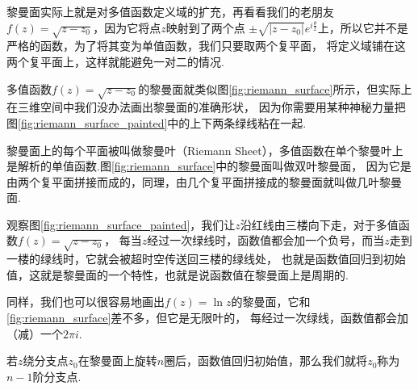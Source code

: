         黎曼面实际上就是对多值函数定义域的扩充，再看看我们的老朋友$f(z) = \sqrt{z - z_0}$，因为它将点$z$映射到了两个点
        $\pm \sqrt{|z - z_0|}e^{i\frac{\theta}{2}}$上，所以它并不是严格的函数，为了将其变为单值函数，我们只要取两个复平面，
        将定义域铺在这两个复平面上，这样就能避免一对二的情况.

        多值函数$f(z) = \sqrt{z - z_0}$的黎曼面就类似图\ref{fig:riemann_surface}所示，但实际上在三维空间中我们没办法画出黎曼面的准确形状，
        因为你需要用某种神秘力量把图\ref{fig:riemann_surface_painted}中的上下两条绿线粘在一起.

        \begin{definition}
            黎曼面上的每个平面被叫做黎曼叶（Riemann Sheet），多值函数在单个黎曼叶上是解析的单值函数.图\ref{fig:riemann_surface}中的黎曼面叫做双叶黎曼面，
            因为它是由两个复平面拼接而成的，同理，由几个复平面拼接成的黎曼面就叫做几叶黎曼面.
        \end{definition}

        观察图\ref{fig:riemann_surface_painted}，我们让$z$沿红线由三楼向下走，对于多值函数$f(z) = \sqrt{z - z_0}$，
        每当$z$经过一次绿线时，函数值都会加一个负号，而当$z$走到一楼的绿线时，它就会被超时空传送回三楼的绿线处，
        也就是函数值回归到初始值，这就是黎曼面的一个特性，也就是说函数值在黎曼面上是周期的.

        同样，我们也可以很容易地画出$f(z) = \ln{z}$的黎曼面，它和\ref{fig:riemann_surface}差不多，但它是无限叶的，
        每经过一次绿线，函数值都会加（减）一个$2\pi i$.

        \begin{definition}
            若$z$绕分支点$z_0$在黎曼面上旋转$n$圈后，函数值回归初始值，那么我们就将$z_0$称为$n - 1$阶分支点.
        \end{definition}

